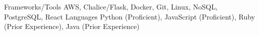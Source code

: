 
\begin{cvskills}
  \cvskill
    {Frameworks/Tools} %
    {AWS, Chalice/Flask, Docker, Git, Linux, NoSQL, PostgreSQL, React} %
  \cvskill
    {Languages} %
    {Python (Proficient), JavaScript (Proficient), Ruby (Prior Experience), Java (Prior Experience)} %
\end{cvskills}
